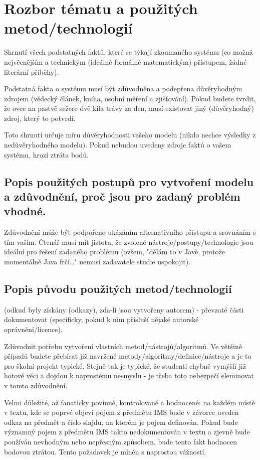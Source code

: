 \documentclass{scrartcl}
\begin{document}
\section{Rozbor tématu a použitých metod/technologií}
\label{sec-2}
Shrnutí všech podstatných faktů, které se týkají zkoumaného systému (co možná
nejvěcnějším a technickým (ideálně formálně matematickým) přístupem, žádné
literární příběhy).

Podstatná fakta o systému musí být zdůvodněna a podepřena důvěryhodným zdrojem
(vědecký článek, kniha, osobní měření a zjišťování). Pokud budete tvrdit, že
ovce na pastvě sežere dvě kila trávy za den, musí existovat jiný (důvěryhodný)
zdroj, který to potvrdí.

Toto shrnutí určuje míru důvěryhodnosti vašeho modelu (nikdo nechce výsledky z
nedůvěryhodného modelu). Pokud nebudou uvedeny zdroje faktů o vašem systému,
hrozí ztráta bodů.

\subsection{Popis použitých postupů pro vytvoření modelu a zdůvodnění, proč jsou pro zadaný problém vhodné.}
\label{sec-2-1}
Zdůvodnění může být podpořeno ukázáním alternativního přístupu a srovnáním s tím
vaším. Čtenář musí mít jistotu, že zvolené nástroje/postupy/technologie jsou
ideální pro řešení zadaného problému (ovšem, "dělám to v Javě, protože
momentálně Java frčí\ldots{}" nemusí zadavatele studie uspokojit).

\subsection{Popis původu použitých metod/technologií}
\label{sec-2-2}
(odkud byly získány (odkazy), zda-li jsou vytvořeny autorem) - převzaté části
dokumentovat (specificky, pokud k nim přísluší nějaké autorské
oprávnění/licence).

Zdůvodnit potřebu vytvoření vlastních metod/nástrojů/algoritmů. Ve většině
případů budete přebírat již navržené metody/algoritmy/definice/nástroje a je to
pro školní projekt typické. Stejně tak je typické, že studenti chybně vymýšlí
již hotové věci a dojdou k naprostému nesmyslu - je třeba toto nebezpečí
eleminovat v tomto zdůvodnění.

Velmi důležité, až fanaticky povinné, kontrolované a hodnocené: na každém místě
v textu, kde se poprvé objeví pojem z předmětu IMS bude v závorce uveden odkaz
na předmět a číslo slajdu, na kterém je pojem definován. Pokud bude významný
pojem z předmětu IMS takto nedokumentován v textu a zjevně bude používán
nevhodným nebo nepřesným způsobem, bude tento fakt hodnocen bodovou
ztrátou. Tento požadavek je míněn s naprostou vážností.
\end{document}
